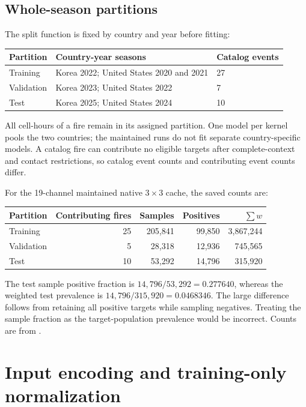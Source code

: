 \documentclass[11pt,a4paper]{article}
\begin{document}
\subsection{Whole-season partitions}

The split function is fixed by country and year before fitting:
\begin{center}
\begin{tabular}{lll}
\hline
Partition & Country-year seasons & Catalog events\\
\hline
Training & Korea 2022; United States 2020 and 2021 & 27\\
Validation & Korea 2023; United States 2022 & 7\\
Test & Korea 2025; United States 2024 & 10\\
\hline
\end{tabular}
\end{center}
All cell-hours of a fire remain in its assigned partition. One model per
kernel pools the two countries; the maintained runs do not fit separate
country-specific models. A catalog fire can contribute no eligible targets
after complete-context and contact restrictions, so catalog event counts and
contributing event counts differ.

For the 19-channel maintained native $3\times3$ cache, the saved counts are:
\begin{center}
\begin{tabular}{lrrrr}
\hline
Partition & Contributing fires & Samples & Positives & $\sum w$\\
\hline
Training & 25 & 205,841 & 99,850 & 3,867,244\\
Validation & 5 & 28,318 & 12,936 & 745,565\\
Test & 10 & 53,292 & 14,796 & 315,920\\
\hline
\end{tabular}
\end{center}
The test sample positive fraction is $14{,}796/53{,}292=0.277640$, whereas
the weighted test prevalence is $14{,}796/315{,}920=0.0468346$. The large
difference follows from retaining all positive targets while sampling
negatives. Treating the sample fraction as the target-population prevalence
would be incorrect. Counts are from
.

\section{Input encoding and training-only normalization}
\label{sec:probability-features}
\end{document}
